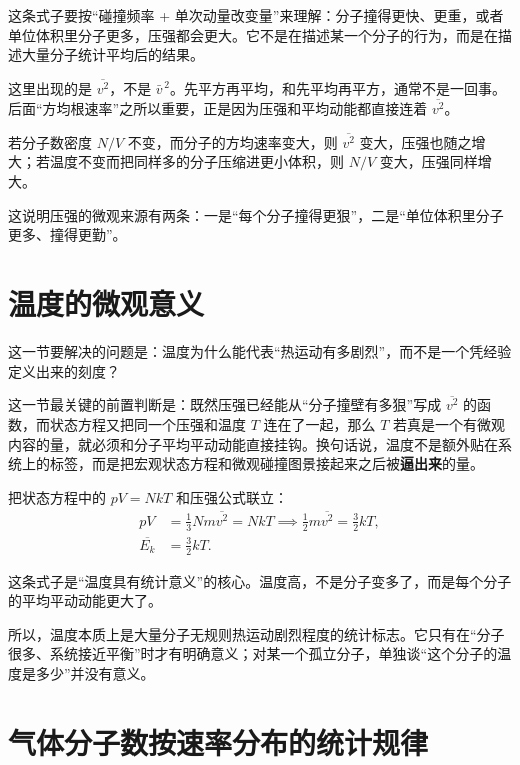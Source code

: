 \documentclass[lang=cn,11pt]{elegantbook}
\newcommand{\bridge}[1]{\begin{note}#1\end{note}}
\begin{document}
\bridge{这条式子要按“碰撞频率 + 单次动量改变量”来理解：分子撞得更快、更重，或者单位体积里分子更多，压强都会更大。它不是在描述某一个分子的行为，而是在描述大量分子统计平均后的结果。}

\begin{remark}
这里出现的是 \(\overline{v^2}\)，不是 \(\bar v^{\,2}\)。先平方再平均，和先平均再平方，通常不是一回事。后面“方均根速率”之所以重要，正是因为压强和平均动能都直接连着 \(\overline{v^2}\)。
\end{remark}

\begin{exercise}[怎样从公式读出压强大小规律]
若分子数密度 \(N/V\) 不变，而分子的方均速率变大，则 \(\overline{v^2}\) 变大，压强也随之增大；若温度不变而把同样多的分子压缩进更小体积，则 \(N/V\) 变大，压强同样增大。

这说明压强的微观来源有两条：一是“每个分子撞得更狠”，二是“单位体积里分子更多、撞得更勤”。
\end{exercise}

\section{温度的微观意义}

这一节要解决的问题是：温度为什么能代表“热运动有多剧烈”，而不是一个凭经验定义出来的刻度？

这一节最关键的前置判断是：既然压强已经能从“分子撞壁有多狠”写成 \(\overline{v^2}\) 的函数，而状态方程又把同一个压强和温度 \(T\) 连在了一起，那么 \(T\) 若真是一个有微观内容的量，就必须和分子平均平动动能直接挂钩。换句话说，温度不是额外贴在系统上的标签，而是把宏观状态方程和微观碰撞图景接起来之后被\textbf{逼出来}的量。

把状态方程中的 \(pV=NkT\) 和压强公式联立：
\[
\begin{aligned}
pV&=\frac{1}{3}Nm\overline{v^2}=NkT
\implies
\frac{1}{2}m\overline{v^2}=\frac{3}{2}kT,\\
\overline{E_k}&=\frac{3}{2}kT.
\end{aligned}
\]

\bridge{这条式子是“温度具有统计意义”的核心。温度高，不是分子变多了，而是每个分子的平均平动动能更大了。}

所以，温度本质上是大量分子无规则热运动剧烈程度的统计标志。它只有在“分子很多、系统接近平衡”时才有明确意义；对某一个孤立分子，单独谈“这个分子的温度是多少”并没有意义。

\section{气体分子数按速率分布的统计规律}
\end{document}

